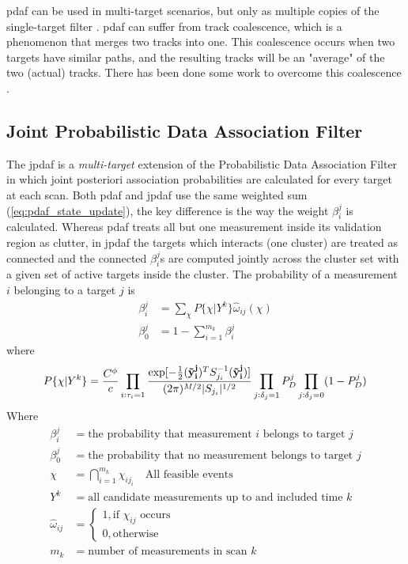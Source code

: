 \gls{pdaf} can be used in multi-\gls{target} scenarios, but only as multiple copies of the single-\gls{target} filter \cite{Fortmann1983}. \gls{pdaf} can suffer from track coalescence, which is a phenomenon that merges two tracks into one. This coalescence occurs when two \glspl{target} have similar paths, and the resulting tracks will be an "average" of the two (actual) tracks. There has been done some work to overcome this coalescence \cite{Blom2000}.

\subsection{Joint Probabilistic Data Association Filter}
\label{sec:jpdaf}
The \gls{jpdaf} is a \emph{multi-\gls{target}} extension of the Probabilistic Data Association Filter in which joint posteriori association probabilities are calculated for every \gls{target} at each scan. Both \gls{pdaf} and \gls{jpdaf} use the same weighted sum (\ref{eq:pdaf_state_update}), the key difference is the way the weight $\beta_i^j$ is calculated. Whereas \gls{pdaf} treats all but one \gls{measurement} inside its validation region as clutter, in \gls{jpdaf} the \glspl{target} which interacts (one cluster) are treated as connected and the connected $\beta_i^j$s are computed jointly across the cluster set with a given set of active \glspl{target} inside the cluster. The probability of a \gls{measurement} $i$ belonging to a \gls{target} $j$ is \cite{Fortmann1983}
\begin{equation}
\begin{split}
\beta_i^j &= \sum_{\chi} P\{ \chi | Y^k \} \hat{\omega}_{ij}(\chi) \\
\beta_0^j &= 1 - \sum_{i=1}^{m_k} \beta_i^j
\end{split}
\end{equation}
where
\begin{equation}
P\{\chi|Y^k\} = \frac{C^\phi}{c} 
				\prod_{i:\tau_i=1} \frac{\mathrm{exp}[-\frac{1}{2}(\boldsymbol{\mathbf{\tilde{y}_i^{j}}})^T S_{j_i}^{-1}(\boldsymbol{\mathbf{\tilde{y}_i^{j}}})]}{(2\pi)^{M/2} |S_{j_i}|^{1/2}}
				\prod_{j:\delta_j=1} P_D^j
				\prod_{j:\delta_j=0} (1 - P_D^j)
\end{equation}%
Where 
\begin{equation*}
\begin{split}
	\beta_i^j			&= \text{the probability that measurement $i$ belongs to target $j$} \\
	\beta_0^j 			&= \text{the probability that no measurement belongs to target $j$} \\
	\chi 				&= \bigcap\limits_{i=1}^{m_k} \chi_{i j_i} \quad \text{All feasible events} \\
	Y^k 				&= \text{all candidate measurements up to and included time $k$} \\
	\hat{\omega}_{ij}	&=	\begin{cases}
								1, \text{if } \chi_{ij} \text{ occurs} \\ 
								0, \text{otherwise} 
							\end{cases} \\
	m_k					&= \text{number of measurements in scan $k$}
\end{split}
\end{equation*}
